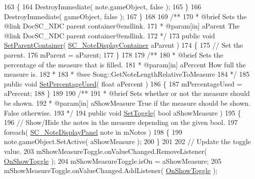 \begin{DoxyCodeInclude}
163         \{
164             DestroyImmediate( note.gameObject, \textcolor{keyword}{false} );
165         \}
166         DestroyImmediate( gameObject, \textcolor{keyword}{false} );
167     \}
168 \textcolor{comment}{}
169 \textcolor{comment}{    /**}
170 \textcolor{comment}{     * @brief Sets the @link DocSC\_NDC parent container@endlink.}
171 \textcolor{comment}{     * @param[in] aParent The @link DocSC\_NDC parent container@endlink.}
172 \textcolor{comment}{    */}
173     \textcolor{keyword}{public} \textcolor{keywordtype}{void} \hyperlink{group___s_c___m_d_p_pub_func_ga334c177603c25d6206b7c7b639281b07}{SetParentContainer}( \hyperlink{class_s_c___note_display_container}{SC\_NoteDisplayContainer} 
      aParent )
174     \{
175         \textcolor{comment}{// Set the parent.}
176         mParent = aParent;
177     \}
178 \textcolor{comment}{}
179 \textcolor{comment}{    /**}
180 \textcolor{comment}{     * @brief Sets the percentage of the measure that is filled.}
181 \textcolor{comment}{     * @param[in] aPercent How full the measure is.}
182 \textcolor{comment}{     * }
183 \textcolor{comment}{     * @see Song::GetNoteLengthRelativeToMeasure}
184 \textcolor{comment}{    */}
185     \textcolor{keyword}{public} \textcolor{keywordtype}{void} \hyperlink{group___s_c___m_d_p_pub_func_gab8a32b1ba282d441cb1325d29f53dd1c}{SetPercentageUsed}( \textcolor{keywordtype}{float} aPercent )
186     \{
187         mPercentageUsed = aPercent;
188     \}
189 \textcolor{comment}{}
190 \textcolor{comment}{    /**}
191 \textcolor{comment}{     * @brief Sets whether or not the measure should be shown.}
192 \textcolor{comment}{     * @param[in] aShowMeasure True if the measure should be shown. False otherwise.}
193 \textcolor{comment}{    */}
194     \textcolor{keyword}{public} \textcolor{keywordtype}{void} \hyperlink{group___s_c___m_d_p_pub_func_ga6512fa5010bcecd85f7e8542cea91310}{SetToggle}( \textcolor{keywordtype}{bool} aShowMeasure )
195     \{
196         \textcolor{comment}{// Show/Hide the notes in the measure depending on the given bool.}
197         \textcolor{keywordflow}{foreach}( \hyperlink{class_s_c___note_display_panel}{SC\_NoteDisplayPanel} note \textcolor{keywordflow}{in} mNotes )
198         \{
199             note.gameObject.SetActive( aShowMeasure );
200         \}
201 
202         \textcolor{comment}{// Update the toggle value.}
203         mShowMeasureToggle.onValueChanged.RemoveListener( \hyperlink{group___s_c___m_d_p_handlers_ga31c72fee5ddd5ae7b057b2f265341263}{OnShowToggle} );
204         mShowMeasureToggle.isOn = aShowMeasure;
205         mShowMeasureToggle.onValueChanged.AddListener( \hyperlink{group___s_c___m_d_p_handlers_ga31c72fee5ddd5ae7b057b2f265341263}{OnShowToggle} );

\end{DoxyCodeInclude}
